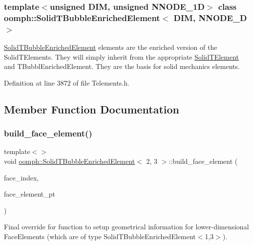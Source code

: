 \subsubsection*{template$<$unsigned D\+IM, unsigned N\+N\+O\+D\+E\+\_\+1D$>$\newline
class oomph\+::\+Solid\+T\+Bubble\+Enriched\+Element$<$ D\+I\+M, N\+N\+O\+D\+E\+\_\+D $>$}

\hyperlink{classoomph_1_1SolidTBubbleEnrichedElement}{Solid\+T\+Bubble\+Enriched\+Element} elements are the enriched version of the Solid\+T\+Elements. They will simply inherit from the appropriate \hyperlink{classoomph_1_1SolidTElement}{Solid\+T\+Element} and T\+Bubbl\+Enriched\+Element. They are the basis for solid mechanics elements. 

Definition at line 3872 of file Telements.\+h.



\subsection{Member Function Documentation}
\mbox{\label{classoomph_1_1SolidTBubbleEnrichedElement_ac8eee06072cefe41b9c1c1ce226e6cf3}} 
\subsubsection{\texorpdfstring{build\+\_\+face\+\_\+element()}{build\_face\_element()}\hspace{0.1cm}{\footnotesize\ttfamily [1/2]}}
{\footnotesize\ttfamily template$<$$>$ \\
void \hyperlink{classoomph_1_1SolidTBubbleEnrichedElement}{oomph\+::\+Solid\+T\+Bubble\+Enriched\+Element}$<$ 2, 3 $>$\+::build\+\_\+face\+\_\+element (\begin{DoxyParamCaption}\item[{const int \&}]{face\+\_\+index,  }\item[{\hyperlink{classoomph_1_1FaceElement}{Face\+Element} $\ast$}]{face\+\_\+element\+\_\+pt }\end{DoxyParamCaption})}

Final override for function to setup geometrical information for lower-\/dimensional Face\+Elements (which are of type Solid\+T\+Bubble\+Enriched\+Element$<$1,3$>$). 

